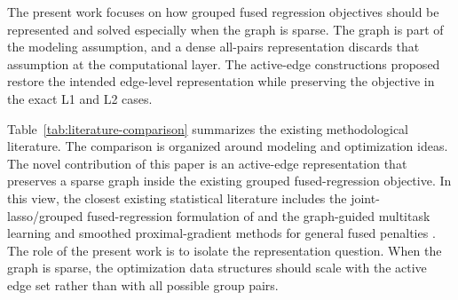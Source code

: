 \documentclass[twoside,11pt]{article}
\begin{document}
The present work focuses on how grouped fused regression objectives should be represented and solved especially when the graph is sparse. 
The graph is part of the modeling assumption, and a dense all-pairs representation discards that assumption at the computational layer. 
The active-edge constructions proposed restore the intended edge-level representation while preserving the objective in the exact L1 and L2 cases.

Table~\ref{tab:literature-comparison} summarizes the existing methodological literature. 
The comparison is organized around modeling and optimization ideas. 
The novel contribution of this paper is an active-edge representation that preserves a sparse graph inside the existing grouped fused-regression objective. 
In this view, the closest existing statistical literature includes the joint-lasso/grouped fused-regression formulation of \citet{dondelinger2020joint} and the graph-guided multitask learning and smoothed proximal-gradient methods for general fused penalties \citep{chen2010graph,chen2012smoothing}. 
The role of the present work is to isolate the representation question. 
When the graph is sparse, the optimization data structures should scale with the active edge set rather than with all possible group pairs.
\end{document}
